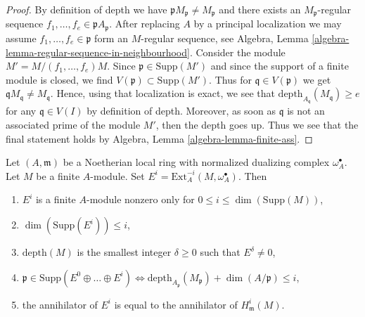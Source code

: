 \begin{proof}
By definition of depth we have $\mathfrak p M_\mathfrak p \not = M_\mathfrak p$
and there exists an $M_\mathfrak p$-regular sequence
$f_1, \ldots, f_e \in \mathfrak p A_\mathfrak p$. After replacing $A$ by
a principal localization we may assume $f_1, \ldots, f_e \in \mathfrak p$
form an $M$-regular sequence, see
Algebra, Lemma \ref{algebra-lemma-regular-sequence-in-neighbourhood}.
Consider the module $M' = M/(f_1, \ldots, f_e)M$.
Since $\mathfrak p \in \text{Supp}(M')$
and since the support of a finite module is closed, we find
$V(\mathfrak p) \subset \text{Supp}(M')$. Thus
for $\mathfrak q \in V(\mathfrak p)$ we get
$\mathfrak q M_\mathfrak q \not = M_\mathfrak q$. Hence, using that
localization is exact, we see that
$\text{depth}_{A_\mathfrak q}(M_\mathfrak q) \geq e$
for any $\mathfrak q \in V(I)$ by definition of depth.
Moreover, as soon as $\mathfrak q$ is not an associated
prime of the module $M'$, then the depth goes up.
Thus we see that the final statement holds by
Algebra, Lemma \ref{algebra-lemma-finite-ass}.
\end{proof}

\begin{lemma}
\label{lemma-sitting-in-degrees}
Let $(A, \mathfrak m)$ be a Noetherian local ring with
normalized dualizing complex $\omega_A^\bullet$.
Let $M$ be a finite $A$-module.
Set $E^i = \text{Ext}_A^{-i}(M, \omega_A^\bullet)$.
Then
\begin{enumerate}
\item $E^i$ is a finite $A$-module nonzero only for
$0 \leq i \leq \dim(\text{Supp}(M))$,
\item $\dim(\text{Supp}(E^i)) \leq i$,
\item $\text{depth}(M)$ is the smallest integer $\delta \geq 0$ such that
$E^\delta \not = 0$,
\item $\mathfrak p \in \text{Supp}(E^0 \oplus \ldots \oplus E^i)
\Leftrightarrow
\text{depth}_{A_\mathfrak p}(M_\mathfrak p) + \dim(A/\mathfrak p) \leq i$,
\item the annihilator of $E^i$ is equal to the annihilator
of $H^i_\mathfrak m(M)$.
\end{enumerate}
\end{lemma}

